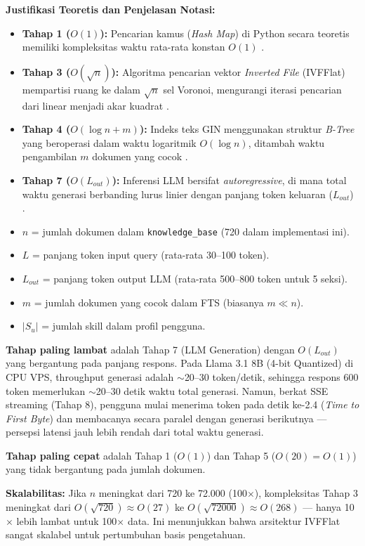 \noindent \textbf{Justifikasi Teoretis dan Penjelasan Notasi:}
\begin{itemize}[noitemsep]
  \item \textbf{Tahap 1 ($O(1)$):} Pencarian kamus (\textit{Hash Map}) di Python secara teoretis memiliki kompleksitas waktu rata-rata konstan $O(1)$ \cite{Cormen2009}.
  \item \textbf{Tahap 3 ($O(\sqrt{n})$):} Algoritma pencarian vektor \textit{Inverted File} (IVFFlat) mempartisi ruang ke dalam $\sqrt{n}$ sel Voronoi, mengurangi iterasi pencarian dari linear menjadi akar kuadrat \cite{Jegou2011}.
  \item \textbf{Tahap 4 ($O(\log n + m)$):} Indeks teks GIN menggunakan struktur \textit{B-Tree} yang beroperasi dalam waktu logaritmik $O(\log n)$, ditambah waktu pengambilan $m$ dokumen yang cocok \cite{Silberschatz2020}.
  \item \textbf{Tahap 7 ($O(L_{out})$):} Inferensi LLM bersifat \textit{autoregressive}, di mana total waktu generasi berbanding lurus linier dengan panjang token keluaran ($L_{out}$) \cite{Vaswani2017}.
  \item $n$ = jumlah dokumen dalam \texttt{knowledge\_base} (720 dalam implementasi ini).
  \item $L$ = panjang token input query (rata-rata 30--100 token).
  \item $L_{out}$ = panjang token output LLM (rata-rata 500--800 token untuk 5 seksi).
  \item $m$ = jumlah dokumen yang cocok dalam FTS (biasanya $m \ll n$).
  \item $|S_u|$ = jumlah skill dalam profil pengguna.
\end{itemize}

\textbf{Tahap paling lambat} adalah Tahap 7 (LLM Generation) dengan $O(L_{out})$
yang bergantung pada panjang respons. Pada Llama 3.1 8B (4-bit Quantized) di CPU VPS, throughput
generasi adalah $\sim$20--30 token/detik, sehingga respons 600 token memerlukan
$\sim$20--30 detik waktu total generasi. Namun, berkat SSE streaming (Tahap 8),
pengguna mulai menerima token pada detik ke-2.4 (\textit{Time to First Byte})
dan membacanya secara paralel dengan generasi berikutnya --- persepsi latensi
jauh lebih rendah dari total waktu generasi.

\textbf{Tahap paling cepat} adalah Tahap 1 ($O(1)$) dan Tahap 5 ($O(20) = O(1)$)
yang tidak bergantung pada jumlah dokumen.

\textbf{Skalabilitas:} Jika $n$ meningkat dari 720 ke 72.000 (100$\times$), kompleksitas
Tahap 3 meningkat dari $O(\sqrt{720}) \approx O(27)$ ke $O(\sqrt{72000}) \approx O(268)$
--- hanya 10$\times$ lebih lambat untuk 100$\times$ data. Ini menunjukkan bahwa
arsitektur IVFFlat sangat skalabel untuk pertumbuhan basis pengetahuan.

